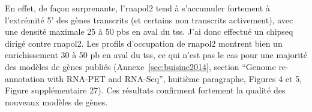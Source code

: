 \documentclass[../main.tex]{subfiles}
\begin{document}
		En effet, de façon surprenante, l'\gls{rnapol2} tend à s'accumuler fortement à l'extrémité 5' des gènes transcrits (et certains non transcrits activement), avec une densité maximale 25 à 50 \glspl{pb} en aval du \gls{tss}.
		J'ai donc effectué un \gls{chipseq} dirigé contre \gls{rnapol2}.
		Les profils d'occupation de \gls{rnapol2} montrent bien un enrichissement 30 à 50 \gls{pb} en aval du \gls{tss}, ce qui n'est pas le cas pour une majorité des modèles de gènes publiés (Annexe~\ref{sec:buisine2014}, section ``Genome re-annotation with RNA-PET and RNA-Seq'', huitième paragraphe, Figures 4 et 5, Figure supplémentaire 27).
		Ces résultats confirment fortement la qualité des nouveaux modèles de gènes.
\end{document}
